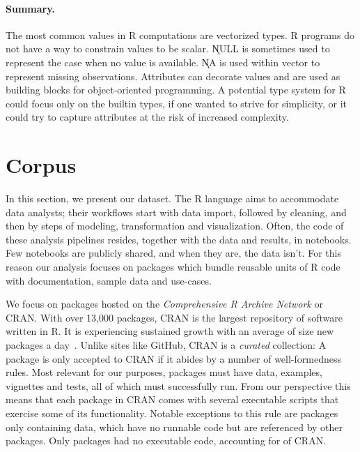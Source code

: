 \documentclass[acmsmall,10pt,review,anonymous]{acmart}\settopmatter{printfolios=true,printccs=false,printacmref=false}
\begin{document}
\paragraph{Summary.} The most common values in R computations are vectorized
types. R programs do not have a way to constrain values to be scalar.
\k{NULL} is sometimes used to represent the case when no value is
available. \k{NA} is used within vector to represent missing observations.
Attributes can decorate values and are used as building blocks for
object-oriented programming. A potential type system for R could focus only
on the builtin types, if one wanted to strive for simplicity, or it could
try to capture attributes at the risk of increased complexity.

\newpage
\section{Corpus}\label{sec:corpus}

In this section, we present our dataset. The R language aims to accommodate
data analysts; their workflows start with data import, followed by cleaning,
and then by steps of modeling, transformation and visualization. Often, the
code of these analysis pipelines resides, together with the data and
results, in notebooks. Few notebooks are publicly shared, and when they are,
the data isn't. For this reason our analysis focuses on packages which
bundle reusable units of R code with documentation, sample data and
use-cases.

We focus on packages hosted on the \emph{Comprehensive R Archive Network} or
CRAN.  With over 13,000 packages, CRAN is the largest repository of software
written in R. It is experiencing sustained growth with an average of size
new packages a day~\cite{LIgges2017}.  Unlike sites like GitHub, CRAN is a
\emph{curated} collection: A package is only accepted to CRAN if it abides
by a number of well-formedness rules.  Most relevant for our purposes,
packages must have data, examples, vignettes and tests, all of which must
successfully run. From our perspective this means that each package in CRAN
comes with several executable scripts that exercise some of its
functionality.  Notable exceptions to this rule are packages only containing
data, which have no runnable code but are referenced by other packages.
Only \DATAPKGS packages had no executable code, accounting for \DATAPKGSPERC
of CRAN.
\end{document}
